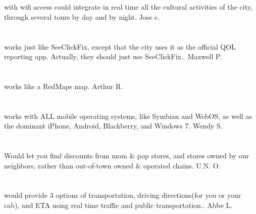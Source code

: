 \section{}with wifi access could integrate in real time all the cultural activities of the city,  through several tours by day and by night. Jose c.
\section{}works just like SeeClickFix,  except that the city uses it as the official QOL reporting app.  Actually,  they should just use SeeClickFix.. Maxwell P.
\section{}works like a RedMaps map. Arthur R.
\section{}works with ALL mobile operating systems,  like Symbian and WebOS,  as well as the dominant iPhone,  Android,  Blackberry,  and Windows 7. Wendy S.
\section{}Would let you find discounts from mom \& pop stores,  and stores owned by our neighbors,  rather than out-of-town owned \& operated chains. U.N. O.
\section{}would provide 3 options of transportation, driving directions(for you or your cab), and ETA using real time traffic and public transportation.. Abbe L.